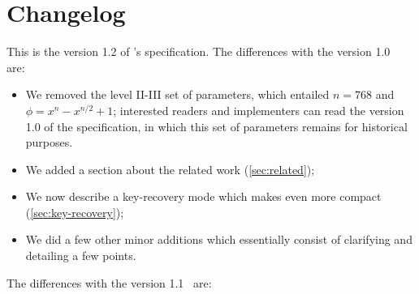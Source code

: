 \section{Changelog}

This is the version 1.2 of \falcon's specification. The differences with the version 1.0~\cite{NISTPQC-R1:FALCON17} are:
\begin{itemize}
	\item We removed the level II-III set of parameters, which entailed $n = 768$ and $\phi = x^n - x^{n/2} + 1$; interested readers and implementers can read the version 1.0 of the specification, in which this set of parameters remains for historical purposes.
	\item We added a section about the related work (\cref{sec:related});
	\item We now describe a key-recovery mode which makes \falcon even more compact (\cref{sec:key-recovery});
	\item We did a few other minor additions which essentially consist of clarifying and detailing a few points.
\end{itemize}
%
The differences with the version 1.1~\cite{NISTPQC-R2:FALCON19} are:
